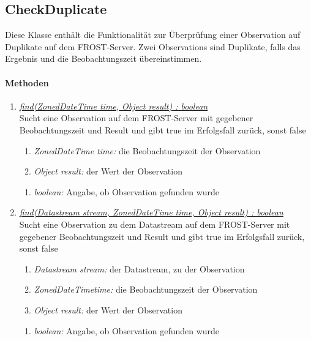 \subsection{CheckDuplicate}

Diese Klasse enthält die Funktionalität zur Überprüfung einer Observation auf Duplikate auf dem FROST-Server.
Zwei Observations sind Duplikate, falls das Ergebnis und die Beobachtungszeit übereinstimmen.

\paragraph{Methoden}
	
	\begin{enumerate}[+]
\item \underline{\textit{find(ZonedDateTime time, Object result) : boolean}}\\
Sucht eine Observation auf dem FROST-Server mit gegebener Beobachtungszeit und Result und gibt true im Erfolgsfall zurück, sonst false
\begin{enumerate}[$\bullet$]
\item \textit{ZonedDateTime time:} die Beobachtungszeit der Observation
\item \textit{Object result:} der Wert der Observation
\end{enumerate}
\vspace{-0.2cm}
\begin{enumerate}[$\circ$]
\item \textit{boolean:} Angabe, ob Observation gefunden wurde
\end{enumerate}
	
\item \underline{\textit{find(Datastream stream, ZonedDateTime time, Object result) : boolean}}\\
Sucht eine Observation zu dem Datastream auf dem FROST-Server mit gegebener Beobachtungszeit und Result und gibt true im Erfolgsfall zurück, sonst false

\begin{enumerate}[$\bullet$]
\item \textit{Datastream stream:} der Datastream, zu der Observation
\item \textit{ZonedDateTimetime:} die Beobachtungszeit der Observation
\item \textit{Object result:} der Wert der Observation
\end{enumerate}
\vspace{-0.2cm}
\begin{enumerate}[$\circ$]
\item \textit{boolean:} Angabe, ob Observation gefunden wurde
\end{enumerate}


\end{enumerate}
